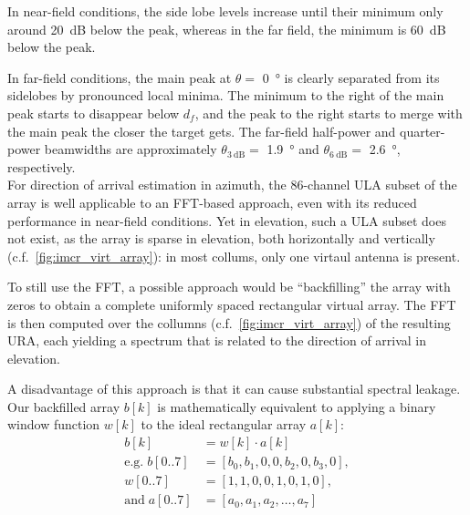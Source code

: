 In near-field conditions, the side lobe levels increase until their minimum only around \SI{20}{\dB} below the peak,
whereas in the far field, the minimum is \SI{60}{\dB} below the peak.

In far-field conditions, the main peak at $\theta =$ \SI{0}{\degree}
is clearly separated from its sidelobes by pronounced local minima.
The minimum to the right of the main peak starts to disappear below $d_f$,
and the peak to the right starts to merge with the main peak the closer the target gets.
The far-field half-power and quarter-power beamwidths are approximately
$\theta_{\SI{3}{\dB}}=$ \SI{1.9}{\degree} and $\theta_{\SI{6}{\dB}}=$ \SI{2.6}{\degree}, respectively. \\

For direction of arrival estimation in azimuth, the 86-channel ULA subset of the array is well applicable to an FFT-based approach,
even with its reduced performance in near-field conditions.
Yet in elevation, such a ULA subset does not exist, as the array is sparse in elevation,
both horizontally and vertically (c.f.\ \ref{fig:imcr_virt_array}):
in most collums, only one virtaul antenna is present.

To still use the FFT, a possible approach would be ``backfilling'' the array with zeros
to obtain a complete uniformly spaced rectangular virtual array.
The FFT is then computed over the collumns (c.f.\ \ref{fig:imcr_virt_array}) of the resulting URA,
each yielding a spectrum that is related to the direction of arrival in elevation.

A disadvantage of this approach is that it can cause substantial spectral leakage.
Our backfilled array $b[k] $ is mathematically equivalent
to applying a binary window function $w[k]$ to the ideal rectangular array $a[k]$:
\begin{align*}
    b[k]                   & =  w[k] \cdot  a[k]             \\
    \text{e.g.}\;  b[0..7] & = [b_0, b_1, 0,0,b_2,0,b_3,0 ], \\
    w[0..7]                & = [1,  1,0,0,1,0,1,0 ],         \\
    \text{and}\; a[0..7]   & = [a_0,a_1,a_2,\dots,a_7]
\end{align*}

